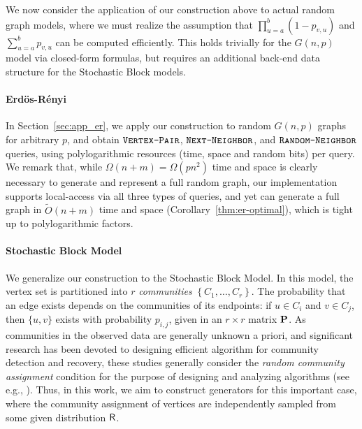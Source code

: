We now consider the application of our construction above to actual random graph models,
where we must realize the assumption that $\prod^{b}_{u=a} (1-p_{v,u})$
and $\sum^{b}_{u=a} p_{v,u}$ can be computed efficiently.
This holds trivially for the $G(n,p)$ model via closed-form formulas,
but requires an additional back-end data structure for the Stochastic Block models.

\paragraph*{Erd\"{o}s-R\'{e}nyi}
\label{par:erdos_renyi}
In Section~\ref{sec:app_er}, we apply our construction to random $G(n,p)$ graphs for
arbitrary $p$, and obtain
$\texttt{\textsc{Vertex-Pair}}$, $\texttt{\textsc{Next-Neighbor}}$, and $\texttt{\textsc{Random-Neighbor}}$ queries,
using polylogarithmic resources (time, space and random bits) per query.
We remark that, while $\Omega(n+m) = \Omega(p n^2)$ time and space
is clearly necessary to generate and represent a full random graph,
our implementation supports local-access via all three types of queries, 
and yet can generate a full graph in $\widetilde{O}(n+m)$ time and space (Corollary~\ref{thm:er-optimal}),
which is tight up to polylogarithmic factors.

\paragraph*{Stochastic Block Model}
\label{par:stochastic_block_model}
We generalize our construction to the Stochastic Block Model.
In this model, the vertex set is partitioned into $r$ \emph{communities}
$\left\{ C_1, \ldots, C_r \right\}$.
The probability that an edge exists depends on the communities of its endpoints:
if $u\in C_i$ and $v \in C_j$, then $\{u,v\}$ exists with probability $p_{i,j}$,
given in an $r\times r$ matrix $\mathbf{P}$.
As communities in the observed data are generally unknown a priori,
and significant research has been devoted to designing efficient algorithm
for community detection and recovery,
these studies generally consider the \emph{random community assignment} condition for the purpose of designing and analyzing algorithms (see e.g., \cite{mossel2015reconstruction}).
Thus, in this work, we aim to construct generators for this important case, where the community assignment of vertices are independently sampled from some given distribution $\mathsf{R}$.

